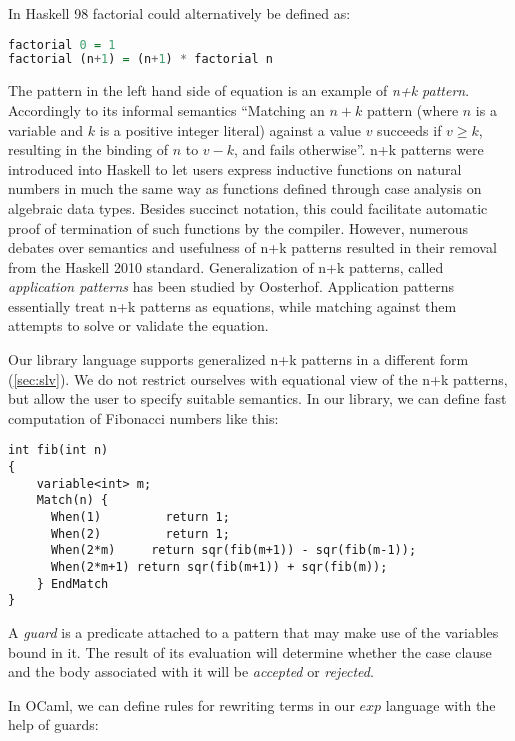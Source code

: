 In Haskell 98\cite{Haskell98Book} factorial could alternatively be defined as:

\begin{lstlisting}[language=Haskell]
factorial 0 = 1
factorial (n+1) = (n+1) * factorial n
\end{lstlisting}

\noindent
The  pattern in the left hand side of equation is an example of 
\emph{n+k pattern}. Accordingly to its informal semantics ``Matching an $n+k$ 
pattern (where $n$ is a variable and $k$ is a positive integer literal) against 
a value $v$ succeeds if $v \ge k$, resulting in the binding of $n$ to $v-k$, and 
fails otherwise''\cite{haskell98}. n+k patterns were introduced into Haskell to 
let users express inductive functions on natural numbers in much the same way as 
functions defined through case analysis on algebraic data types. Besides 
succinct notation, this could facilitate automatic proof of 
termination of such functions by the compiler.
However, numerous debates over semantics and usefulness of n+k patterns
resulted in their removal from the Haskell 
2010 standard\cite{haskell2010}. Generalization of n+k patterns, called 
\emph{application patterns} has been studied by Oosterhof\cite{OosterhofThesis}. 
Application patterns essentially treat n+k patterns as equations, while matching 
against them attempts to solve or validate the equation.

Our library language supports generalized n+k patterns in a different form 
(\textsection\ref{sec:slv}). We do not restrict ourselves with equational view 
of the n+k patterns, but allow the user to specify suitable semantics.
In our library, we can define fast computation of Fibonacci numbers like this:

\begin{lstlisting}[keepspaces]
int fib(int n)
{
    variable<int> m;
    Match(n) {
      When(1)         return 1;     
      When(2)         return 1;
      When(2*m)     return sqr(fib(m+1)) - sqr(fib(m-1));
      When(2*m+1) return sqr(fib(m+1)) + sqr(fib(m));
    } EndMatch
}
\end{lstlisting}

\noindent
A \emph{guard} 
is a predicate attached to a pattern that may make use of the variables bound in 
it. The result of its evaluation will determine whether the case clause and the 
body associated with it will be \emph{accepted} or \emph{rejected}.

In OCaml, we can define rules for rewriting terms in 
our $exp$ language with the help of guards:

